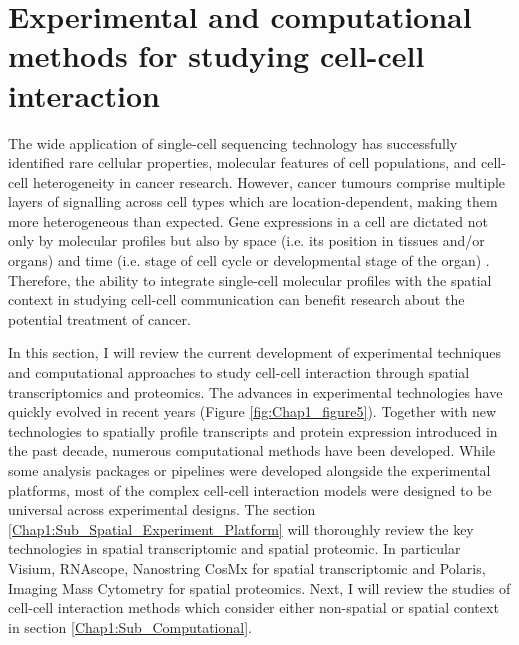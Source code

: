 \section{Experimental and computational methods for studying cell-cell interaction}
\label{section:lit_review}
The wide application of single-cell sequencing technology has successfully identified rare cellular properties, molecular features of cell populations, and cell-cell heterogeneity in cancer research. However, cancer tumours comprise multiple layers of signalling across cell types which are location-dependent, making them more heterogeneous than expected. Gene expressions in a cell are dictated not only by molecular profiles but also by space (i.e. its position in tissues and/or organs) and time (i.e. stage of cell cycle or developmental stage of the organ) \cite{salomon2020genomic}. Therefore, the ability to integrate single-cell molecular profiles with the spatial context in studying cell-cell communication can benefit research about the potential treatment of cancer.

In this section, I will review the current development of experimental techniques and computational approaches to study cell-cell interaction through spatial transcriptomics and proteomics. The advances in experimental technologies have quickly evolved in recent years (Figure \ref{fig:Chap1_figure5}). Together with new technologies to spatially profile transcripts and protein expression introduced in the past decade, numerous computational methods have been developed. While some analysis packages or pipelines were developed alongside the experimental platforms, most of the complex cell-cell interaction models were designed to be universal across experimental designs. The section \ref{Chap1:Sub_Spatial_Experiment_Platform} will thoroughly review the key technologies in spatial transcriptomic and spatial proteomic. In particular Visium, RNAscope, Nanostring CosMx for spatial transcriptomic and Polaris, Imaging Mass Cytometry for spatial proteomics. Next, I will review the studies of cell-cell interaction methods which consider either non-spatial or  spatial context in section \ref{Chap1:Sub_Computational}.                

